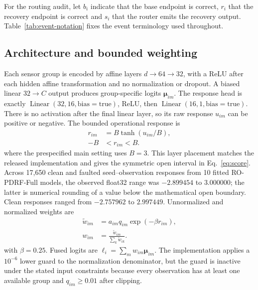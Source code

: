 \documentclass[11pt]{article}
\begin{document}
For the routing audit, let $b_i$ indicate that the base endpoint is correct, $r_i$ that the recovery endpoint is correct and $s_i$ that the router emits the recovery output. Table~\ref{tab:event-notation} fixes the event terminology used throughout.

\begin{table}[ht]
\centering
\caption{Hard-decision event definitions and denominators. $N_C$ and $N_H$ count correction and harm opportunities; $n_C$ and $n_H$ count retained corrections and realized harms. Prevention is $1-n_H/N_H$, whereas recovery retention is $n_C/N_C$.}
\label{tab:event-notation}
\resizebox{\textwidth}{!}{}
\end{table}

\subsection{Architecture and bounded weighting}

Each sensor group is encoded by affine layers $d\rightarrow64\rightarrow32$, with a ReLU after each hidden affine transformation and no normalization or dropout. A biased linear $32\rightarrow C$ output produces group-specific logits $\boldsymbol{\mu}_{im}$. The response head is exactly $\operatorname{Linear}(32,16,\mathrm{bias}=\mathrm{true})$, ReLU, then $\operatorname{Linear}(16,1,\mathrm{bias}=\mathrm{true})$. There is no activation after the final linear layer, so its raw response $u_{im}$ can be positive or negative. The bounded operational response is
\begin{equation}
\begin{aligned}
r_{im}&=B\tanh(u_{im}/B),\\
-B&<r_{im}<B.
\end{aligned}
\label{eq:score}
\end{equation}
where the prespecified main setting uses $B=3$. This layer placement matches the released implementation and gives the symmetric open interval in Eq.~\eqref{eq:score}. Across 17,650 clean and faulted seed--observation responses from 10 fitted RO-PDRF-Full models, the observed float32 range was $-2.899454$ to $3.000000$; the latter is numerical rounding of a value below the mathematical open boundary. Clean responses ranged from $-2.757962$ to $2.997449$. Unnormalized and normalized weights are
\begin{equation}
\begin{aligned}
\widetilde w_{im}&=a_{im}q_{im}\exp(-\beta r_{im}),\\
 w_{im}&=\frac{\widetilde w_{im}}{\sum_k\widetilde w_{ik}}.
\end{aligned}
\label{eq:weights}
\end{equation}
with $\beta=0.25$. Fused logits are $\boldsymbol{\ell}_i=\sum_mw_{im}\boldsymbol{\mu}_{im}$. The implementation applies a $10^{-6}$ lower guard to the normalization denominator, but the guard is inactive under the stated input constraints because every observation has at least one available group and $q_{im}\geq0.01$ after clipping.
\end{document}
